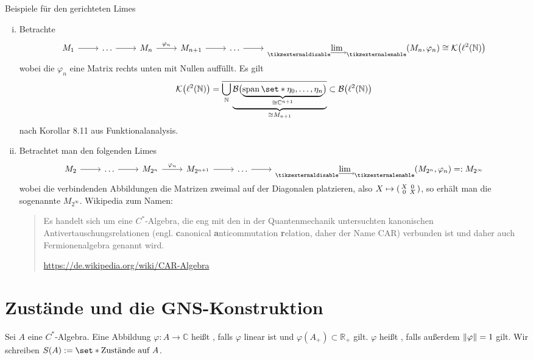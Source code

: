 \begin{beispiel}[{name=[gerichtete Limites von $C^*$-Algebren]}]
	Beispiele für den gerichteten Limes
	\begin{enumerate}[(i)]
		\item Betrachte
		\[
			\begin{tikzcd}
				M_1 \rar & \ldots  \rar & M_n \rar["\varphi_n"] & M_{n+1} \rar & \ldots \rar & \displaystyle\Dlim (M_n,\varphi_n) \cong \mathcal{K} \enbrace*{\ell^2(\mathbb{N})}
			\end{tikzcd}
		\]
		wobei die $\varphi_n$ eine Matrix rechts unten mit Nullen auffüllt. Es gilt
		\[
			\mathcal{K} \enbrace*{\ell^2(\mathbb{N})} = \overline{\bigcup_\mathbb{N} \Underbrace{\mathcal{B} \enbrace[\big]{\Underbrace{\Span \set*{\eta_0, \ldots , \eta_n}}{\cong \mathbb{C}^{n+1}}}}{\cong M_{n+1}}} \subset \mathcal{B} \enbrace*{\ell^2(\mathbb{N})}
		\]
		nach Korollar 8.11 aus Funktionalanalysis.
		\item Betrachtet man den folgenden Limes
		\[
			\begin{tikzcd}
				M_2 \rar & \ldots  \rar & M_{2^n} \rar["\varphi_n"] & M_{2^{n+1}} \rar & \ldots \rar & \displaystyle\Dlim (M_{2^n},\varphi_n) =: M_{2^\infty}
			\end{tikzcd}
		\]
		wobei die verbindenden Abbildungen die Matrizen zweimal auf der Diagonalen platzieren, also $X \mapsto \begin{psmallmatrix}
			X & 0 \\
			0 & X 
		\end{psmallmatrix}$, so erhält man die sogenannte  $M_{2^\infty}$. 
		Wikipedia zum Namen:
		
		\blockquote[\url{https://de.wikipedia.org/wiki/CAR-Algebra}]{Es handelt sich um eine $C^*$-Algebra, die eng mit den in der Quantenmechanik untersuchten kanonischen Antivertauschungsrelationen (engl. \textbf{c}anonical \textbf{a}nticommutation \textbf{r}elation, daher der Name CAR) verbunden ist und daher auch Fermionenalgebra genannt wird.}
	\end{enumerate}
\end{beispiel}
\newpage

\section{Zustände und die GNS-Konstruktion} %
\label{sec:5}

\begin{definition}[{name=[positive Funktionale und Zustände]}]
	Sei $A$ eine $C^*$-Algebra. 
	Eine Abbildung $\varphi \colon A \to \mathbb{C}$ heißt , falls $\varphi$ linear ist und $\varphi(A_+) \subset \mathbb{R}_+$ gilt. 
	$\varphi$ heißt , falls außerdem $\norm*{\varphi}= 1$ gilt. 
	Wir schreiben $S(A) := \set*{\text{Zustände auf }A}$.
\end{definition}

